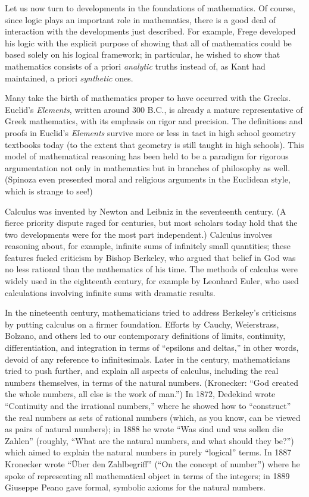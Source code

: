 \documentclass[../../../include/open-logic-section]{subfiles}
\begin{document}
Let us now turn to developments in the foundations of mathematics. Of
course, since logic plays an important role in mathematics, there is a
good deal of interaction with the developments just described. For
example, Frege developed his logic with the explicit purpose of
showing that all of mathematics could be based solely on his logical
framework; in particular, he wished to show that mathematics consists
of a priori \emph{analytic} truths instead of, as Kant had maintained,
a priori \emph{synthetic} ones.

Many take the birth of mathematics proper to have occurred with the
Greeks. Euclid's \emph{Elements}, written around 300 B.C., is already
a mature representative of Greek mathematics, with its emphasis on
rigor and precision. The definitions and proofs in Euclid's
\emph{Elements} survive more or less in tact in high school geometry
textbooks today (to the extent that geometry is still taught in high
schools). This model of mathematical reasoning has been held to be a
paradigm for rigorous argumentation not only in mathematics but in
branches of philosophy as well. (Spinoza even presented moral and
religious arguments in the Euclidean style, which is strange to see!)

Calculus was invented by Newton and Leibniz in the seventeenth
century. (A fierce priority dispute raged for centuries, but most
scholars today hold that the two developments were for the most part
independent.)  Calculus involves reasoning about, for example,
infinite sums of infinitely small quantities; these features fueled
criticism by Bishop Berkeley, who argued that belief in God was no
less rational than the mathematics of his time. The methods of
calculus were widely used in the eighteenth century, for example by
Leonhard Euler, who used calculations involving infinite sums with
dramatic results.

In the nineteenth century, mathematicians tried to address Berkeley's
criticisms by putting calculus on a firmer foundation. Efforts by
Cauchy, Weierstrass, Bolzano, and others led to our contemporary
definitions of limits, continuity, differentiation, and integration in
terms of ``epsilons and deltas,'' in other words, devoid of any
reference to infinitesimals. Later in the century, mathematicians
tried to push further, and explain all aspects of calculus, including
the real numbers themselves, in terms of the natural numbers.
(Kronecker: ``God created the whole numbers, all else is the work of
man.'') In 1872, Dedekind wrote ``Continuity and the irrational
numbers,'' where he showed how to ``construct'' the real numbers as
sets of rational numbers (which, as you know, can be viewed as pairs
of natural numbers); in 1888 he wrote ``Was sind und was sollen die
Zahlen'' (roughly, ``What are the natural numbers, and what should
they be?'') which aimed to explain the natural numbers in purely
``logical'' terms. In 1887 Kronecker wrote ``\"Uber den Zahlbegriff''
(``On the concept of number'') where he spoke of representing all
mathematical object in terms of the integers; in 1889 Giuseppe Peano
gave formal, symbolic axioms for the natural numbers.
\end{document}
